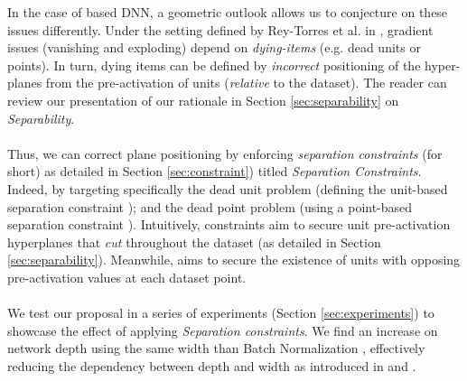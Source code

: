 In the case of \ReLU based DNN, a geometric outlook allows us to conjecture on these issues differently. Under the setting defined by Rey-Torres et al. in \cite{reyRiera2019ModellingClassificationReLU},  gradient issues (vanishing and exploding) depend on \emph{dying-items} (e.g. dead units or points). In turn, dying items can be defined by  \emph{incorrect} positioning of the hyper-planes from the pre-activation of \ReLU units (\emph{relative} to the dataset). The reader can review our presentation of our rationale in Section \ref{sec:separability} on \emph{Separability}. 
\\\\
Thus, we can correct plane positioning by enforcing \emph{separation constraints} (\SepConstraint for short) as detailed in Section \ref{sec:constraint}) titled \emph{Separation Constraints}. Indeed, by targeting specifically the dead unit problem (defining the unit-based separation constraint \SepUnit); and the dead point problem (using a point-based separation constraint \SepPoint). Intuitively, \SepUnit constraints aim to secure unit pre-activation hyperplanes that \emph{cut} throughout the dataset (as detailed in Section \ref{sec:separability}). Meanwhile,  \SepPoint aims to secure the existence of units with opposing pre-activation values at each dataset point. 
\\\\
We test our proposal in a series of experiments (Section \ref{sec:experiments}) to showcase the effect of applying \emph{Separation constraints}. We find an increase on network depth using the same width than Batch Normalization \cite{batchnorm}, effectively reducing the dependency between depth and width as introduced in \cite{simpnet} and \cite{densenet}.  

